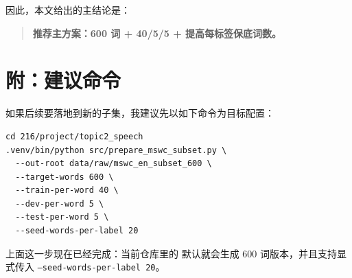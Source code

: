 \documentclass[11pt,a4paper]{ctexart}
\begin{document}
因此，本文给出的主结论是：
\begin{quote}
\textbf{推荐主方案：600 词 + 40/5/5 + 提高每标签保底词数。}
\end{quote}

\section*{附：建议命令}

如果后续要落地到新的子集，我建议先以如下命令为目标配置：

\begin{verbatim}
cd 216/project/topic2_speech
.venv/bin/python src/prepare_mswc_subset.py \
  --out-root data/raw/mswc_en_subset_600 \
  --target-words 600 \
  --train-per-word 40 \
  --dev-per-word 5 \
  --test-per-word 5 \
  --seed-words-per-label 20
\end{verbatim}

上面这一步现在已经完成：当前仓库里的  默认就会生成 600 词版本，并且支持显式传入 \texttt{--seed-words-per-label 20}。
\end{document}
